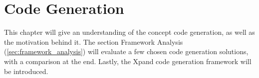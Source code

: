 \chapter{Code Generation}\label{chap:code_generation}
This chapter will give an understanding of the concept code generation, as well as the motivation behind it. The section Framework Analysis (\ref{sec:framework_analysis}) will evaluate a few chosen code generation solutions, with a comparison at the end. Lastly, the Xpand code generation framework will be introduced. 

